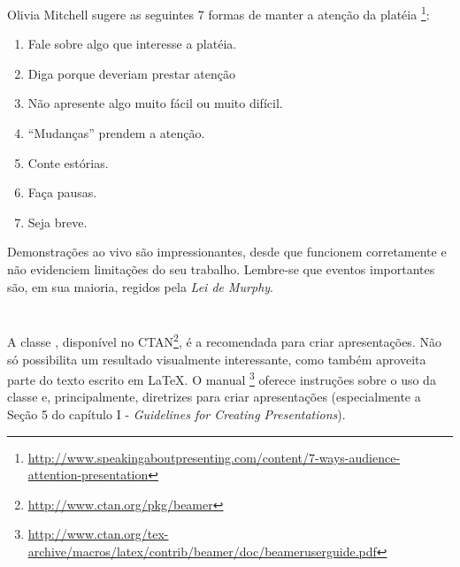 Olivia Mitchell sugere as seguintes 7 formas de manter a atenção da platéia%
\footnote{\url{http://www.speakingaboutpresenting.com/content/7-ways-audience-attention-presentation}}:
\begin{enumerate}
\item Fale sobre algo que interesse a platéia.
\item Diga porque deveriam prestar atenção
\item Não apresente algo muito fácil ou muito difícil.
\item ``Mudanças'' prendem a atenção.
\item Conte estórias.
\item Faça pausas.
\item Seja breve.
\end{enumerate}

Demonstrações ao vivo são impressionantes, desde que funcionem corretamente e não
evidenciem limitações do seu trabalho. Lembre-se que eventos importantes são, em
sua maioria, regidos pela \emph{Lei de Murphy}.%

\newcommand{\beamer}{{}}%
\section{\beamer}
A classe \beamer, disponível no CTAN\footnote{\url{http://www.ctan.org/pkg/beamer}},
é a recomendada para criar apresentações. Não só possibilita um resultado visualmente
interessante, como também aproveita parte do texto escrito em \LaTeX. O manual%
\footnote{\url{http://www.ctan.org/tex-archive/macros/latex/contrib/beamer/doc/beameruserguide.pdf}} 
oferece instruções sobre o uso da classe e, principalmente, diretrizes para criar
apresentações (especialmente a Seção 5 do capítulo I - \emph{Guidelines for 
Creating Presentations}).